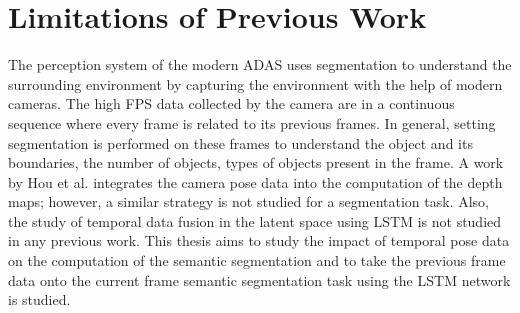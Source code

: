     \section{Limitations of Previous Work}
    
    The perception system of the modern ADAS uses segmentation to understand the surrounding environment by capturing the environment with the help of modern cameras. The high FPS data collected by the camera are in a continuous sequence where every frame is related to its previous frames. In general, setting segmentation is performed on these frames to understand the object and its boundaries, the number of objects, types of objects present in the frame. A work by Hou et al. \cite{52_hou2019multi} integrates the camera pose data into the computation of the depth maps; however, a similar strategy is not studied for a segmentation task. Also, the study of temporal data fusion in the latent space using LSTM is not studied in any previous work. This thesis aims to study the impact of temporal pose data on the computation of the semantic segmentation and to take the previous frame data onto the current frame semantic segmentation task using the LSTM network is studied. 
    

